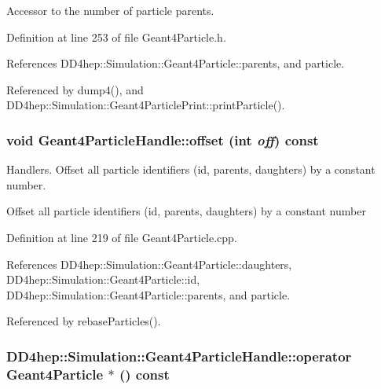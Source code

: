 Accessor to the number of particle parents. 

Definition at line 253 of file Geant4Particle.h.

References DD4hep::Simulation::Geant4Particle::parents, and particle.

Referenced by dump4(), and DD4hep::Simulation::Geant4ParticlePrint::printParticle().\hypertarget{class_d_d4hep_1_1_simulation_1_1_geant4_particle_handle_a6eae2e14da760e078d339e54bd7f4312}{
\subsubsection[{offset}]{\setlength{\rightskip}{0pt plus 5cm}void Geant4ParticleHandle::offset (int {\em off}) const}}
\label{class_d_d4hep_1_1_simulation_1_1_geant4_particle_handle_a6eae2e14da760e078d339e54bd7f4312}


Handlers. Offset all particle identifiers (id, parents, daughters) by a constant number.

Offset all particle identifiers (id, parents, daughters) by a constant number 

Definition at line 219 of file Geant4Particle.cpp.

References DD4hep::Simulation::Geant4Particle::daughters, DD4hep::Simulation::Geant4Particle::id, DD4hep::Simulation::Geant4Particle::parents, and particle.

Referenced by rebaseParticles().\hypertarget{class_d_d4hep_1_1_simulation_1_1_geant4_particle_handle_a3db45353903b41b7da55863e51e50f1e}{
\subsubsection[{operator Geant4Particle $\ast$}]{\setlength{\rightskip}{0pt plus 5cm}DD4hep::Simulation::Geant4ParticleHandle::operator {\bf Geant4Particle} $\ast$ () const}}
\label{class_d_d4hep_1_1_simulation_1_1_geant4_particle_handle_a3db45353903b41b7da55863e51e50f1e}


